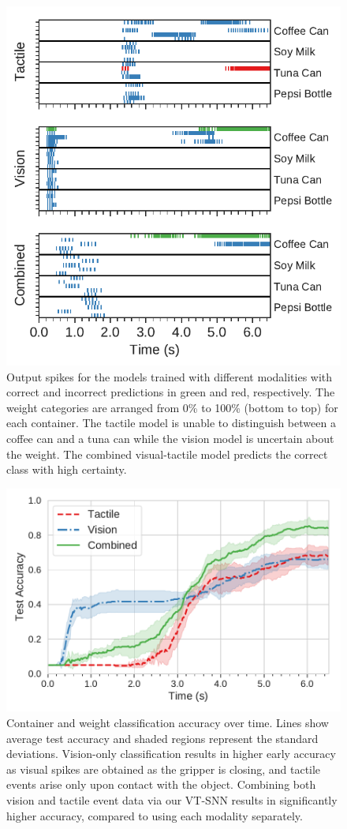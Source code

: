\documentclass[fyp]{socreport}
\begin{document}
\begin{figure}
\centering
\includegraphics[width=0.80\columnwidth]{images/analysis/spike_class_output.pdf}
\caption{Output spikes for the models trained with different modalities with
  correct and incorrect predictions in green and red, respectively. The weight
  categories are arranged from 0\% to 100\% (bottom to top) for each container.
  The tactile model is unable to distinguish between a coffee can and a tuna can
  while the vision model is uncertain about the weight. The combined
  visual-tactile model predicts the correct class with high certainty.}
\label{fig:spikeclass}
\end{figure}

\begin{figure}
  \centering
  \includegraphics[width=0.85\columnwidth]{images/analysis/object_det_over_time.pdf}
  \caption{Container and weight classification accuracy over time. Lines show
    average test accuracy and shaded regions represent the standard deviations.
    Vision-only classification results in higher early accuracy as visual spikes
    are obtained as the gripper is closing, and tactile events arise only upon
    contact with the object. Combining both vision and tactile event data via
    our VT-SNN results in significantly higher accuracy, compared to using each
    modality separately. }
\label{fig:classtime}
\end{figure}
\end{document}
